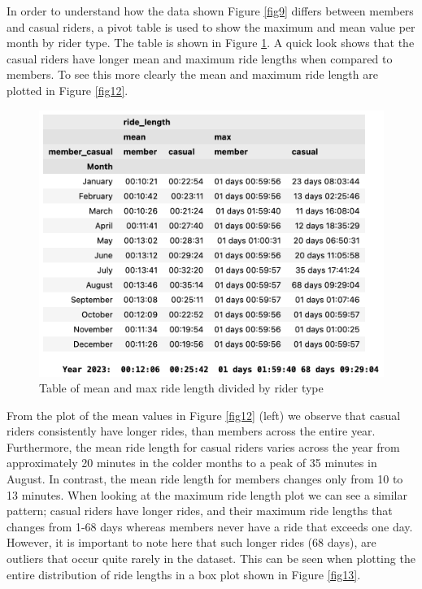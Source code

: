 \documentclass[12pt]{article}
\begin{document}
\begin{itemize}
	In order to understand how the data shown Figure \ref{fig9} differs between members and casual riders, a pivot table is used to show the maximum and mean value per month by rider type. The table is shown in Figure \ref{fig11}. A quick look shows that the casual riders have longer mean and maximum ride lengths when compared to members. To see this more clearly the mean and maximum ride length are plotted in Figure \ref{fig12}.  
		\pagebreak
		
	\begin{figure}[h]
	\centering
	\includegraphics[scale=0.6]{imgMeanMax2.png} 
	\caption{Table of mean and max ride length divided by rider type}
	\label{fig11}
	\end{figure}
	
From the plot of the mean values in Figure \ref{fig12} (left) we observe that casual riders consistently have longer rides, than members across the entire year. Furthermore, the mean ride length for casual riders varies across the year from approximately 20 minutes in the colder months to a peak of 35 minutes in August. In contrast, the mean ride length for members changes only from 10 to 13 minutes. When looking at the maximum ride length plot we can see a similar pattern; casual riders have longer rides, and their maximum ride lengths that changes from 1-68 days whereas members never have a ride that exceeds one day. However, it is important to note here that such longer rides (68 days), are outliers that occur quite rarely in the dataset. This can be seen when plotting the entire distribution of ride lengths in a box plot shown in Figure \ref{fig13}.  
	

\end{itemize}
\end{document}
